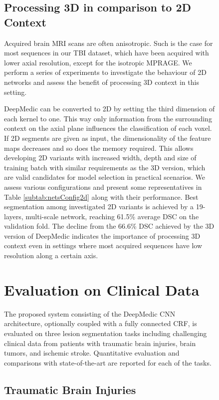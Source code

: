 \documentclass[preprint,authoryear,12pt]{elsarticle}
\begin{document}
\begin{figure}[h]
\subsection{Processing 3D in comparison to 2D Context}
\label{subsec:val3dContext}

Acquired brain MRI scans are often anisotropic. Such is the case for most sequences in our TBI dataset, which have been acquired with lower axial resolution, except for the isotropic MPRAGE. We perform a series of experiments to investigate the behaviour of 2D networks and assess the benefit of processing 3D context in this setting.

DeepMedic can be converted to 2D by setting the third dimension of each kernel to one. This way only information from the surrounding context on the axial plane influences the classification of each voxel. If 2D segments are given as input, the dimensionality of the feature maps decreases and so does the memory required. This allows developing 2D variants with increased width, depth and size of training batch with similar requirements as the 3D version, which are valid candidates for model selection in practical scenarios. We assess various configurations and present some representatives in Table \ref{subtab:netsConfig2d} along with their performance. Best segmentation among investigated 2D variants is achieved by a 19-layers, multi-scale network, reaching 61.5\% average DSC on the validation fold. The decline from the 66.6\% DSC achieved by the 3D version of DeepMedic indicates the importance of processing 3D context even in settings where most acquired sequences have low resolution along a certain axis.
 





\section{Evaluation on Clinical Data}
\label{sec:evaluation}

The proposed system consisting of the DeepMedic CNN architecture, optionally coupled with a fully connected CRF, is evaluated on three lesion segmentation tasks including challenging clinical data from patients with traumatic brain injuries, brain tumors, and ischemic stroke. Quantitative evaluation and comparisons with state-of-the-art are reported for each of the tasks.

\subsection{Traumatic Brain Injuries}
\label{subsec:evalTbi}


\end{figure}
\end{document}
